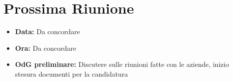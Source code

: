 \documentclass[a4paper, 11pt]{article}
\begin{document}
\vspace{0.5cm}
\section{Prossima Riunione}
\begin{itemize}
    \item \textbf{Data:}  Da concordare
    \item \textbf{Ora:} Da concordare
    \item \textbf{OdG preliminare:} Discutere sulle riunioni fatte con le aziende, inizio stesura documenti per la candidatura
\end{itemize}
\end{document}
